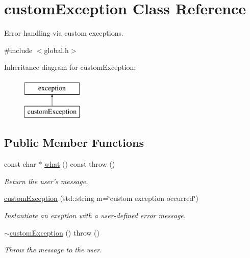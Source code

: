 \hypertarget{classcustom_exception}{\section{custom\-Exception Class Reference}
\label{classcustom_exception}
}


Error handling via custom exceptions.  




{\ttfamily \#include $<$global.\-h$>$}

Inheritance diagram for custom\-Exception\-:\begin{figure}[H]
\begin{center}
\leavevmode
\includegraphics[height=2.000000cm]{classcustom_exception}
\end{center}
\end{figure}
\subsection*{Public Member Functions}
\begin{DoxyCompactItemize}
\item 
const char $\ast$ \hyperlink{classcustom_exception_aeb6ab5848b038adfc68fde86a512f691}{what} () const   throw ()
\begin{DoxyCompactList}\small\item\em Return the user's message. \end{DoxyCompactList}\item 
\hyperlink{classcustom_exception_a02ff9f09c4dd8c0b62fb1b6438d7d71a}{custom\-Exception} (std\-::string m=\char`\"{}custom exception occurred\char`\"{})
\begin{DoxyCompactList}\small\item\em Instantiate an exeption with a user-\/defined error message. \end{DoxyCompactList}\item 
\hyperlink{classcustom_exception_a361fad49d4068f3d5fe8d4a1a962791a}{$\sim$custom\-Exception} ()  throw ()
\begin{DoxyCompactList}\small\item\em Throw the message to the user. \end{DoxyCompactList}\end{DoxyCompactItemize}


